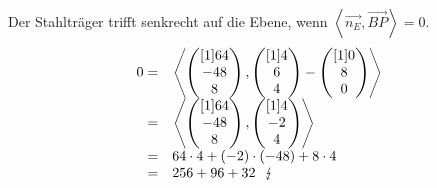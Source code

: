 Der Stahlträger trifft senkrecht auf die Ebene, wenn $\left< \vec{n_{E}} ,\vec{BP} \right> =0$.
\begin{equation*}
	\begin{array}{ r l }
		0 = &
		\left< \begin{pmatrix}[1]
			64\\
			-48\\
			8
		\end{pmatrix} ,\begin{pmatrix}[1]
			4\\
			6\\
			4
		\end{pmatrix}-\begin{pmatrix}[1]
			0\\
			8\\
			0
		\end{pmatrix}\right>\\
		= & 
		\left< \begin{pmatrix}[1]
			64\\
			-48\\
			8
		\end{pmatrix} ,\begin{pmatrix}[1]
			4\\
			-2\\
			4
		\end{pmatrix}\right>\\
		= & 64\cdot 4 + (-2)\cdot (-48) + 8\cdot 4\\
		= & 256 + 96 + 32\ \ \lightning \\
	\end{array}
\end{equation*}